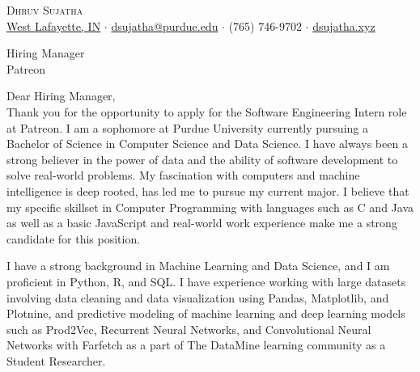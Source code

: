 \documentclass[a4paper]{article}
\begin{document}
\vspace*{-40pt}

    

\vspace*{-10pt}
\begin{center}
	{\Huge \scshape {Dhruv Sujatha}}\\
	\href{https://www.google.com/maps/place/West+Lafayette,+IN/}{West Lafayette, IN} $\cdot$ \href{mailto:dsujatha@purdue.edu}{dsujatha@purdue.edu} $\cdot$ (765) 746-9702 $\cdot$ \href{https://dsujatha.xyz}{dsujatha.xyz}\\
\end{center}

\hrulefill
\fontsize{14pt}{17pt}\selectfont

\vspace*{30pt}
Hiring Manager\\
Patreon

\vspace*{30pt}

Dear Hiring Manager,\\
\vspace*{20pt}
Thank you for the opportunity to apply for the Software Engineering Intern role at Patreon. 
I am a sophomore at Purdue University currently pursuing a Bachelor of Science in Computer Science and Data Science.
I have always been a strong believer in the power of data and the ability of software development to solve real-world problems. 
My fascination with computers and machine intelligence is deep rooted, has led me to pursue my current major. 
I believe that my specific skillset in Computer Programming with languages such as C and Java as well as a basic JavaScript and real-world work experience make me a strong candidate for this position.

\vspace*{20pt}

I have a strong background in Machine Learning and Data Science, 
and I am proficient in Python, R, and SQL. I have experience working with large datasets
involving data cleaning and data visualization using Pandas, Matplotlib, and Plotnine, and predictive modeling of machine learning 
and deep learning models such as Prod2Vec, Recurrent Neural Networks, and Convolutional Neural Networks with Farfetch as a part of The DataMine learning community as a Student Researcher. \\

\vspace*{20pt}
\end{document}
